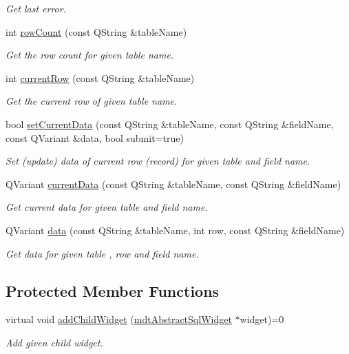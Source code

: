\begin{DoxyCompactItemize}
\begin{DoxyCompactList}\small\item\em Get last error. \end{DoxyCompactList}\item 
int \hyperlink{classmdt_sql_form_a7d50c271fc506764ed20dd88914d0ddc}{rowCount} (const QString \&tableName)
\begin{DoxyCompactList}\small\item\em Get the row count for given table name. \end{DoxyCompactList}\item 
int \hyperlink{classmdt_sql_form_a855de08e9ddb3f7898ef4ceb0b0331f9}{currentRow} (const QString \&tableName)
\begin{DoxyCompactList}\small\item\em Get the current row of given table name. \end{DoxyCompactList}\item 
bool \hyperlink{classmdt_sql_form_aa377e70f4a2e865b0b696957c0fca766}{setCurrentData} (const QString \&tableName, const QString \&fieldName, const QVariant \&data, bool submit=true)
\begin{DoxyCompactList}\small\item\em Set (update) data of current row (record) for given table and field name. \end{DoxyCompactList}\item 
QVariant \hyperlink{classmdt_sql_form_aca283557b7e2586779cb5c498d388f14}{currentData} (const QString \&tableName, const QString \&fieldName)
\begin{DoxyCompactList}\small\item\em Get current data for given table and field name. \end{DoxyCompactList}\item 
QVariant \hyperlink{classmdt_sql_form_a0c27d6a9ecbf0589f313c7193c632a62}{data} (const QString \&tableName, int row, const QString \&fieldName)
\begin{DoxyCompactList}\small\item\em Get data for given table , row and field name. \end{DoxyCompactList}\end{DoxyCompactItemize}
\subsection*{Protected Member Functions}
\begin{DoxyCompactItemize}
\item 
\hypertarget{classmdt_sql_form_ab84800b7913120c5a89d86f7d3eee8c1}{
virtual void \hyperlink{classmdt_sql_form_ab84800b7913120c5a89d86f7d3eee8c1}{addChildWidget} (\hyperlink{classmdt_abstract_sql_widget}{mdtAbstractSqlWidget} $\ast$widget)=0}
\label{classmdt_sql_form_ab84800b7913120c5a89d86f7d3eee8c1}

\begin{DoxyCompactList}\small\item\em Add given child widget. \end{DoxyCompactList}\end{DoxyCompactItemize}


